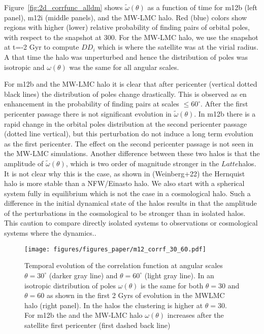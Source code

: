 \documentclass{aastex63}
\newcommand{\latte}{$Latte$}
\begin{document}

Figure~\ref{fig:2d_corrfunc_alldm} shows $\tilde{\omega}(\theta)$ as a function of time for m12b (left panel), m12i (middle panels), and the MW-LMC halo. Red (blue) colors show regions with higher (lower) relative probability of finding pairs of orbital poles, with respect to the snapshot at 300. For the MW-LMC halo, we use the snapshot at  t=-2 Gyr to compute $DD_i$ which is where the satellite was at the virial radius. A that time the halo was unperturbed and hence the distribution of poles was isotropic and $\omega (\theta)$ was the same for all angular scales.

For m12b and the MW-LMC halo it is clear that after pericenter (vertical dotted black lines) the distribution of poles change drastically. This is observed as en enhancement in the probability of finding pairs at scales $\leq 60^{\circ}$. After the first pericenter passage there is not significant evolution in $\tilde{\omega}(\theta)$. In m12b there is a rapid change in the orbital poles distribution at the second pericenter passage (dotted line vertical), but this perturbation do not induce a long term evolution as the first pericenter. The effect on the second pericenter passage is not seen in the MW-LMC simulations. Another difference between these two halos is that the amplitude of $\tilde{\omega}(\theta)$, which is two order of magnitude stronger in the \latte halos. It is not clear why this is the case, as shown in (Weinberg+22) the Hernquist halo is more stable than a NFW/Einasto halo. We also start with a spherical system fully in equilibrium which is not the case in a cosmological halo. Such a difference in the initial dynamical state of the halos results in that the amplitude of the perturbations in the cosmological to be stronger than in isolated halos. This caution to compare directly isolated systems to observations or cosmological systems where the dynamics..

\begin{figure*}[h]
    \centering
    \texttt{[image: figures/figures\_paper/m12\_corrf\_30\_60.pdf]}
    \caption{Temporal evolution of the correlation function at angular scales
    $\theta=30^{\circ}$ (darker gray line) and $\theta=60^{\circ}$ (light gray
    line). In an isotropic distribution of poles $\omega(\theta)$ is the same for both $\theta=30$ and $\theta=60$ as
  shown in the first 2 Gyrs of evolution in the MWLMC halo (right panel). In the
\Latte halos the clustering is higher at $\theta=30$. For m12b the and the
MW-LMC halo $\omega (\theta)$ increases after the satellite first pericenter
(first dashed back line)}
    \label{fig:corrfunc_30_60}
\end{figure*}
\end{document}
